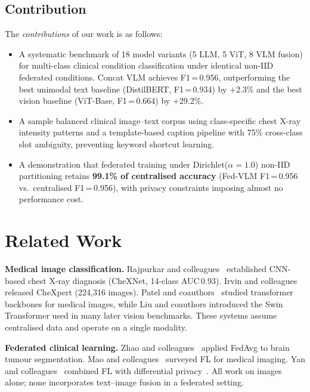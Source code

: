 \documentclass[conference]{IEEEtran}
\begin{document}
\subsection{Contribution}
The \textit{contributions} of our work is as follows:
\begin{itemize}
  \item A systematic benchmark of 18 model variants (5 LLM, 5 ViT, 8 VLM fusion) for multi-class clinical condition classification under identical non-IID federated conditions. Concat VLM achieves
        F1\,=\,0.956, outperforming the best unimodal text baseline
        (DistilBERT, F1\,=\,0.934) by $+$2.3\% and the best vision
        baseline (ViT-Base, F1\,=\,0.664) by $+$29.2\%.

  \item A sample balanced clinical image--text corpus using
        class-specific chest X-ray intensity patterns and a
        template-based caption pipeline with 75\% cross-class slot
        ambiguity, preventing keyword shortcut learning.

  \item A demonstration that federated training under
        Dirichlet($\alpha{=}1.0$) non-IID partitioning retains
        \textbf{99.1\% of centralised accuracy} (Fed-VLM
        F1\,=\,0.956 vs.\ centralised F1\,=\,0.956), with
        privacy constraints imposing almost no performance cost.
\end{itemize}

\section{Related Work}

\textbf{Medical image classification.}
Rajpurkar and colleagues~\cite{Rajpurkar2017} established CNN-based
chest X-ray diagnosis (CheXNet, 14-class AUC\,0.93).
Irvin and colleagues~\cite{Irvin2019} released CheXpert
(224{,}316 images). Patel and coauthors~\cite{Akkaya2024}
studied transformer backbones for medical images, while Liu and
coauthors introduced the Swin Transformer used in
many later vision benchmarks. These systems assume centralised data and
operate on a single modality.

\textbf{Federated clinical learning.}
Zhao and colleagues~\cite{Zhao2025} applied FedAvg to brain
tumour segmentation. Mao and colleagues~\cite{Mao2025} surveyed FL
for medical imaging. Yan and colleagues~\cite{Yan2024} combined
FL with differential privacy~\cite{Abadi2016}. All work on images alone;
none incorporates text--image fusion in a federated setting.
\end{document}
